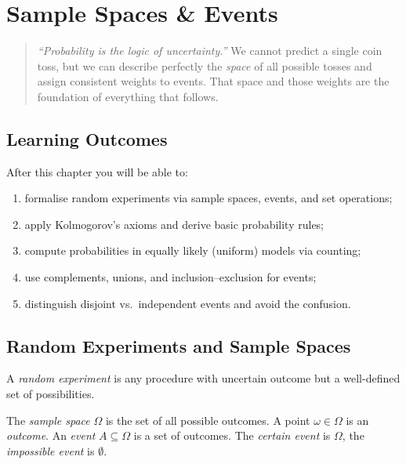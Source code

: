 \chapter{Sample Spaces \& Events}
\label{ch:samplespaces}

\begin{quote}
\emph{``Probability is the logic of uncertainty.''} We cannot predict a single coin toss, but we can describe perfectly the \emph{space} of all possible tosses and assign consistent weights to events. That space and those weights are the foundation of everything that follows.
\end{quote}

\noindent{}
\vspace{0.4em}

\section*{Learning Outcomes}
After this chapter you will be able to:
\begin{enumerate}[label=(L\arabic*)]
    \item formalise random experiments via sample spaces, events, and set operations;
    \item apply Kolmogorov's axioms and derive basic probability rules;
    \item compute probabilities in equally likely (uniform) models via counting;
    \item use complements, unions, and inclusion--exclusion for events;
    \item distinguish disjoint vs.\ independent events and avoid the confusion.
\end{enumerate}

\section{Random Experiments and Sample Spaces}
\label{sec:sample-space}
A \emph{random experiment} is any procedure with uncertain outcome but a well-defined set of possibilities.

\begin{definition} The \emph{sample space} $\Omega$ is the set of all possible outcomes. A point $\omega\in\Omega$ is an \emph{outcome}. An \emph{event} $A\subseteq\Omega$ is a set of outcomes. The \emph{certain event} is $\Omega$, the \emph{impossible event} is $\emptyset$.
\end{definition}

